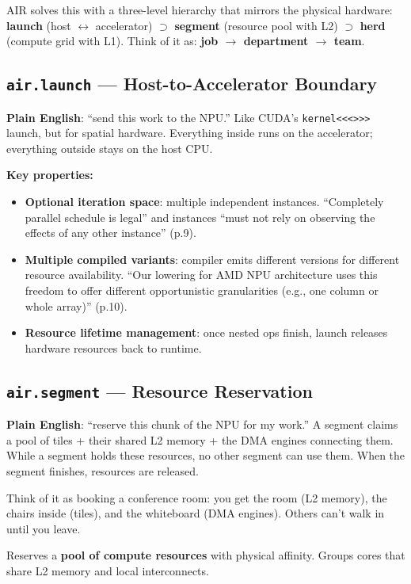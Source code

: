 \documentclass[11pt,a4paper]{article}
\begin{document}
AIR solves this with a three-level hierarchy that mirrors the physical hardware:
\textbf{launch} (host $\leftrightarrow$ accelerator) $\supset$ \textbf{segment}
(resource pool with L2) $\supset$ \textbf{herd} (compute grid with L1). Think of
it as: \textbf{job $\rightarrow$ department $\rightarrow$ team}.

\subsection{\texttt{air.launch} --- Host-to-Accelerator Boundary}

\textbf{Plain English}: ``send this work to the NPU.'' Like CUDA's
\texttt{kernel<<<>>>} launch, but for spatial hardware. Everything inside runs on
the accelerator; everything outside stays on the host CPU.

\textbf{Key properties:}
\begin{itemize}[leftmargin=2em]
  \item \textbf{Optional iteration space}: multiple independent instances. ``Completely
    parallel schedule is legal'' and instances ``must not rely on observing the effects
    of any other instance'' (p.9).
  \item \textbf{Multiple compiled variants}: compiler emits different versions for
    different resource availability. ``Our lowering for AMD NPU architecture uses
    this freedom to offer different opportunistic granularities (e.g., one column or
    whole array)'' (p.10).
  \item \textbf{Resource lifetime management}: once nested ops finish, launch releases
    hardware resources back to runtime.
\end{itemize}

\subsection{\texttt{air.segment} --- Resource Reservation}

\textbf{Plain English}: ``reserve this chunk of the NPU for my work.'' A segment
claims a pool of tiles + their shared L2 memory + the DMA engines connecting them.
While a segment holds these resources, no other segment can use them. When the
segment finishes, resources are released.

Think of it as booking a conference room: you get the room (L2 memory), the chairs
inside (tiles), and the whiteboard (DMA engines). Others can't walk in until you
leave.

Reserves a \textbf{pool of compute resources} with physical affinity. Groups cores
that share L2 memory and local interconnects.
\end{document}
